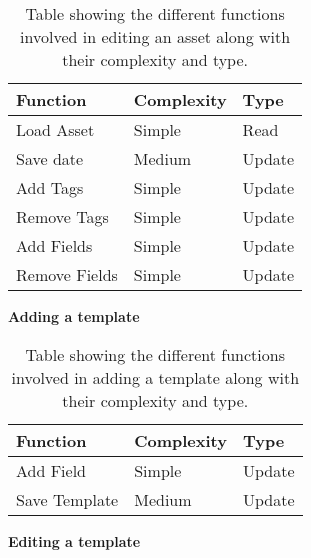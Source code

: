 \begin{table}[H]
\centering
    \begin{tabular}{|l|l|l|}
        \hline
        \textbf{Function} & \textbf{Complexity} & \textbf{Type} \\
        \hline
        \hline
        Load Asset & Simple & Read\\
        \hline
        Save date & Medium & Update\\
        \hline
        Add Tags & Simple & Update\\
        \hline
        Remove Tags & Simple & Update\\
        \hline
        Add Fields & Simple & Update\\
        \hline
        Remove Fields & Simple & Update\\
        \hline
        
    \end{tabular}
\caption{Table showing the different functions involved in editing an asset along with their complexity and type.}\label{tab:EditAssetFunctions}
\end{table}

\par

\begin{center}
    \textbf{Adding a template}
\end{center}

\begin{table}[H]
\centering
    \begin{tabular}{|l|l|l|}
        \hline
        \textbf{Function} & \textbf{Complexity} & \textbf{Type} \\
        \hline
        \hline
        Add Field & Simple & Update\\
        \hline
        Save Template & Medium & Update\\
        \hline
        
    \end{tabular}
\caption{Table showing the different functions involved in adding a template along with their complexity and type.}\label{tab:AddTemplateFunctions}
\end{table}

\par

\begin{center}
    \textbf{Editing a template}
\end{center}

